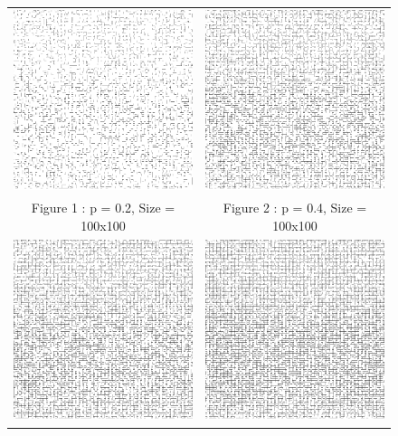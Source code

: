 \documentclass{article}
\begin{document}
\begin{figure}
\begin{tabular}{cc}
  \includegraphics[width=55mm]{perc_20_1} &   \includegraphics[width=55mm]{perc_40_1} \\
Figure 1 : p = 0.2, Size = 100x100 & Figure 2 : p = 0.4, Size = 100x100 \\[6pt]
 \includegraphics[width=55mm]{perc_50_1} &   \includegraphics[width=55mm]{perc_60_1} \\

\end{tabular}
\end{figure}
\end{document}
